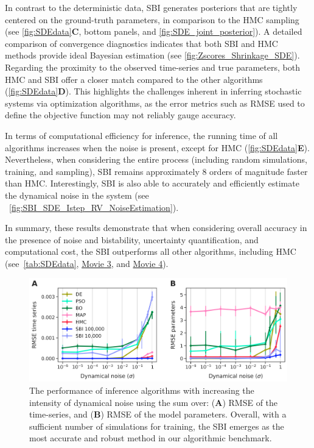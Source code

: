 \documentclass[preprint,11pt,authoryear]{elsarticle}
\begin{document}
In contrast to the deterministic data, SBI generates posteriors that are tightly centered on the ground-truth parameters, in comparison to the HMC sampling (see \autoref{fig:SDEdata}\textbf{C}, bottom panels, and \autoref{fig:SDE_joint_posterior}). A detailed comparison of convergence diagnostics indicates that both SBI and HMC methods provide ideal Bayesian estimation (see \autoref{fig:Zscores_Shrinkage_SDE}).
Regarding the proximity to the observed time-series and true parameters, both HMC and SBI offer a closer match compared to the other algorithms (\autoref{fig:SDEdata}\textbf{D}). This highlights the challenges inherent in inferring stochastic systems via optimization algorithms, as the error metrics such as RMSE used to define the objective function may not reliably gauge accuracy. 

In terms of computational efficiency for inference, the running time of all algorithms increases when the noise is present, except for HMC (\autoref{fig:SDEdata}\textbf{E}). Nevertheless, when considering the entire process (including random simulations, training, and sampling), SBI remains approximately 8 orders of magnitude faster than HMC. Interestingly, SBI is also able to accurately and efficiently estimate the dynamical noise in the system (see ~\autoref{fig:SBI_SDE_Istep_RV_NoiseEstimation}). 

In summary, these results demonstrate that when considering overall accuracy in the presence of noise and bistability, uncertainty quantification, and computational cost, the SBI outperforms all other algorithms, including HMC (see~\autoref{tab:SDEdata},  \href{run:./Videos/Movie3_MPR_SDE_HMC_RV.mp4}{Movie 3}, and  \href{run:./Videos/Movie4_MPR_SDE_SBI_RV.mp4}{Movie 4}). 


\begin{figure}[ht]
    \centering
    \includegraphics[width=\linewidth]{Figs/Fig3.png}
    \caption{The performance of inference algorithms with increasing the intensity of dynamical noise using the sum over: (\textbf{A}) RMSE of the time-series, and (\textbf{B}) RMSE of the model parameters. Overall, with a sufficient number of simulations for training, the SBI emerges as the most accurate and robust method in our algorithmic benchmark.
    }
    \label{fig:NoiseSweep}
\end{figure}
\end{document}
